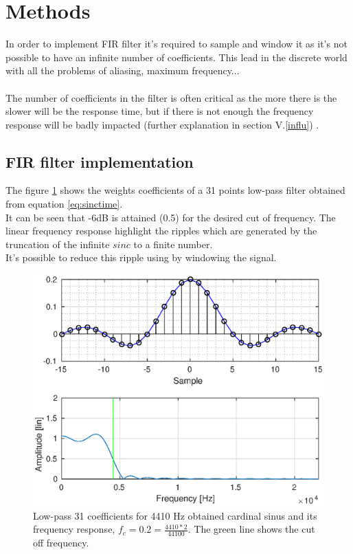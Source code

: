 \documentclass[twoside,twocolumn]{article}
\begin{document}
\section{Methods}

In order to implement FIR filter it's required to sample and window it as it's not possible to have an infinite number of coefficients. This lead in the discrete world with all the problems of aliasing, maximum frequency...\\ \\ The number of coefficients in the filter is often critical as the more there is the slower will be the response time, but if there is not enough the frequency response will be badly impacted (further explanation in section V.\ref{influ}) . \\


\subsection{FIR filter implementation}
The figure \ref{discrete_sinc} shows the weights coefficients of a 31 points low-pass filter obtained from equation \ref{eq:sinctime}.\\ It can be seen  that -6dB is attained (0.5) for the desired cut of frequency. The linear frequency response highlight the ripples which are generated by the truncation of the infinite $sinc$ to a finite number.\\ It's possible to reduce this ripple using by windowing the signal.
\begin{figure}[h!]
	\centering
	\includegraphics[scale=0.45]{./images/lp_31pts_fc02.eps}
	\caption{Low-pass 31 coefficients for 4410 Hz obtained cardinal sinus and its frequency response, $f_c=0.2=\frac{4410*2}{44100}$. The green line shows the cut off frequency.}
	\label{discrete_sinc}
\end{figure}
\end{document}
